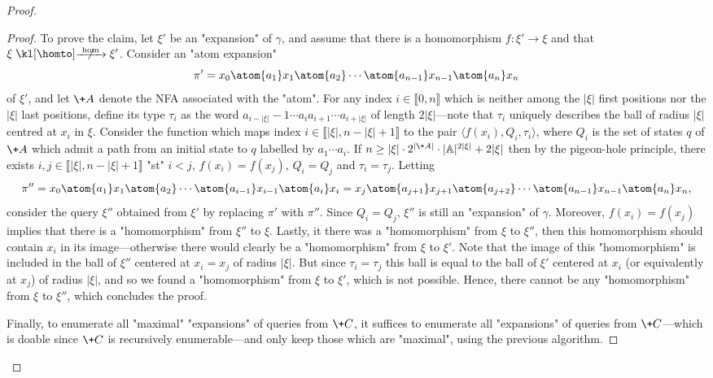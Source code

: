 \begin{proof}
\begin{proof}
        To prove the claim, let $\xi'$ be an "expansion" of $\gamma$, and assume that there is 
        a homomorphism $f\colon \xi' \to \xi$ and that $\xi \nothomto \xi'$. Consider an "atom expansion"
        \[
            \pi' = x_0 \atom{a_1} x_1 \atom{a_2} \cdots \atom{a_{n-1}} x_{n-1} \atom{a_n} x_n
        \]
        of $\xi'$, and let $\+A$ denote the NFA associated with the "atom".
        For any index $i \in \lBrack 0,n\rBrack$ which is neither among the $|\xi|$ first positions
        nor the $|\xi|$ last positions, define its type $\tau_i$ as
        the word $a_{i-|\xi|}-1 \cdots a_i a_{i+1} \cdots a_{i+|\xi|}$ of length $2|\xi|$---note that $\tau_i$ uniquely describes the ball of radius $|\xi|$ centred at $x_i$ in $\xi$.
        Consider the function which maps index $i \in \lBrack |\xi|, n-|\xi|+1\rBrack$
        to the pair $\langle f(x_i), Q_i , \tau_i \rangle$, where $Q_i$ is the set of states $q$
        of $\+A$ which admit a path from an initial state to $q$ labelled by $a_1\cdots a_i$.
        If $n \geq |\xi|\cdot 2^{|\+A|}\cdot |\A|^{2|\xi|} + 2|\xi|$ then by the pigeon-hole principle,
        there exists $i,j \in \lBrack |\xi|, n-|\xi|+1\rBrack$ "st" $i<j$, $f(x_i) = f(x_j)$,
        $Q_i = Q_j$ and $\tau_i = \tau_j$. Letting
        \[
            \pi'' = x_0 \atom{a_1} x_1 \atom{a_2} \cdots \atom{a_{i-1}} x_{i-1} \atom{a_i} x_i = x_j
            \atom{a_{j+1}} x_{j+1} \atom{a_{j+2}} \cdots \atom{a_{n-1}} x_{n-1} \atom{a_n} x_n,
        \]
        consider the query $\xi''$ obtained from $\xi'$ 
        by replacing $\pi'$ with $\pi''$.
        Since $Q_i = Q_j$, $\xi''$ is still an "expansion" of $\gamma$.
        Moreover, $f(x_i) = f(x_j)$ implies that there is a "homomorphism" from $\xi''$ to $\xi$.
        Lastly, it there was a "homomorphism" from $\xi$ to $\xi''$,
        then this homomorphism should contain $x_i$ in its image---otherwise there would clearly be a "homomorphism" from $\xi$ to $\xi'$. Note that the image of this "homomorphism"
        is included in the ball of $\xi''$ centered at $x_i = x_j$ of radius $|\xi|$.
        But since $\tau_i = \tau_j$ this ball is equal to the ball of $\xi'$ centered at $x_i$
        (or equivalently at $x_j$) of radius $|\xi|$, and so we found a "homomorphism" from
        $\xi$ to $\xi'$, which is not possible. Hence, there cannot be any "homomorphism" from
        $\xi$ to $\xi''$, which concludes the proof.

        Finally, to enumerate all "maximal" "expansions" of queries from $\+C$,
        it suffices to enumerate all "expansions" of queries from $\+C$---which is doable since $\+C$ is recursively enumerable---and only keep those which are "maximal", using the previous algorithm.
    \end{proof}


\end{proof}
